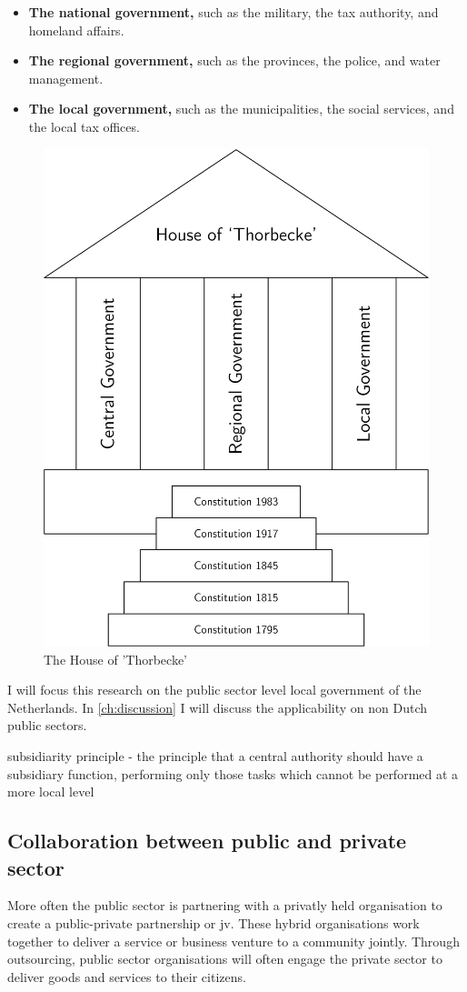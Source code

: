\begin{itemize}
	\item{\textbf{The national government,} such as the military, the tax authority, and homeland affairs.}
	\item{\textbf{The regional government,} such as the provinces, the police, and water management.}
	\item{\textbf{The local government,} such as the municipalities, the social services, and the local tax offices.}
\end{itemize}

\begin{figure}[H]
	\centering
	\includegraphics[width=0.4\linewidth]{images/thorbecke}
	\caption[The House of 'Thorbecke']{The House of 'Thorbecke'}
	\label{fig:houseofthorbecke}
\end{figure}


I will focus this research on the public sector level local government of the Netherlands. In \cref{ch:discussion} I will discuss the applicability on non Dutch public sectors.



subsidiarity principle - the principle that a central authority should have a subsidiary function, performing only those tasks which cannot be performed at a more local level


\subsection{Collaboration between public and private sector}

More often the public sector is partnering with a privatly held organisation to create a public-private partnership or \acrfull{jv}. These hybrid organisations work together to deliver a service or business venture to a community jointly. Through outsourcing, public sector organisations will often engage the private sector to deliver goods and services to their citizens. 

